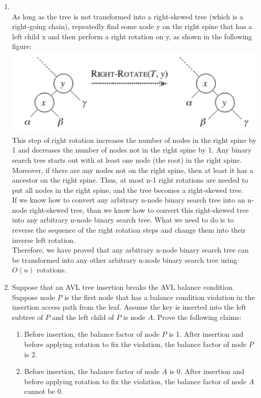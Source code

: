 \documentclass[12pt,a4paper]{article}
\makeatletter
\newtheorem*{solution}{Solution}
\theoremstyle{definition}
\renewenvironment{solution}[1][Solution] {\par\pushQED{\qed}\normalfont\topsep6\p@\@plus6\p@\relax\trivlist\item[\hskip\labelsep\bfseries#1\@addpunct{.}]\ignorespaces}{\popQED\endtrivlist\@endpefalse} \makeatother
\makeatother
\begin{document}
\begin{enumerate}
\begin{solution} 
\quad\\
As long as the tree is not transformed into a right-skewed tree (which is a right-going chain), repeatedly find some node y on the right spine that has a left child x and
then perform a right rotation on y, as shown in the following figure:\\
\includegraphics[scale=0.8]{p3.png}\\
This step of right rotation increases the number of nodes in the right spine by 1 and decreases the number of nodes not in the right spine by 1. Any binary search tree starts out with at least one node (the root) in the right spine. Moreover, if there are any nodes not on the right spine, then at least it has a ancestor on the right spine. Thus, at most n-1 right rotations are needed to put all nodes in the right spine, and the tree becomes a right-skewed tree.\\
If we know how to convert any arbitrary n-node binary search tree into an n-node right-skewed tree, than we know how to convert this right-skewed tree into any arbitrary n-node binary search tree. What we need to do is to reverse the sequence of the right rotation steps and change them into their inverse left rotation.\\
Therefore, we have proved that any arbitrary n-node binary search tree can be transformed into any other arbitrary n-node binary search tree using $O(n)$ rotations. 
\end{solution}

\item  Suppose that an AVL tree insertion breaks the AVL balance condition. Suppose node $P$ is the first node that has a balance condition violation in the insertion access path from the leaf. Assume the key is inserted into the left subtree of $P$ and the left child of $P$ is node $A$. Prove the following claims:
	\begin{enumerate}
		\item  Before insertion, the balance factor of node $P$ is 1. After insertion and before applying rotation to fix the violation, the balance factor of node $P$ is 2.
		\item Before insertion, the balance factor of node $A$ is 0. After insertion and before applying rotation to fix the violation, the balance factor of node $A$ cannot be 0.
	\end{enumerate}
	

\end{enumerate}
\end{document}
